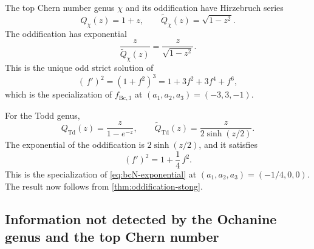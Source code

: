 \documentclass[14pt,dvipsnames]{extarticle}
\makeatletter
\numberwithin{equation}{subsection}
\theoremstyle{plain}
\theoremstyle{definition}
\theoremstyle{definition}
\renewenvironment{proof}[1][\proofname]{
 \par\pushQED{\qed}\normalfont
 \topsep6\p@\@plus6\p@\relax
 \trivlist\item[\hskip\labelsep\bfseries\itshape #1\@addpunct{.}]
}{\popQED\endtrivlist\@endpefalse}
\DeclareMathOperator{\Td}{Td}
\newcommand{\Bc}{\mathrm{Bc}}
\makeatother
\begin{document}
\begin{proof}[Proof of \cref{cor:bc-euler-todd-stong}]
The top Chern number genus $\chi$ and its oddification have Hirzebruch series
\[
 Q_\chi(z)=1+z,
 \qquad
 \widetilde Q_\chi(z)=\sqrt{1-z^2}.
\]
The oddification has exponential
\[
 \frac{z}{\widetilde Q_\chi(z)}
 =\frac{z}{\sqrt{1-z^2}}.
\]
This is the unique odd strict solution of
\[
 (\,f')^2=(1+f^2)^3
 =1+3f^2+3f^4+f^6,
\]
which is the specialization of $f_{\Bc,3}$ at
$(a_1,a_2,a_3)=(-3,3,-1)$.

For the Todd genus,
\[
 Q_{\Td}(z)=\frac{z}{1-e^{-z}},
 \qquad
 \widetilde Q_{\Td}(z)=\frac{z}{2\sinh(z/2)}.
\]
The exponential of the oddification is $2\sinh(z/2)$, and it satisfies
\[
 (f')^2=1+\frac14\,f^2.
\]
This is the specialization of \eqref{eq:bcN-exponential} at
$(a_1,a_2,a_3)=(-1/4,0,0)$. The result now follows from
\cref{thm:oddification-stong}.
\end{proof}

\subsection{Information not detected by the Ochanine genus and the top Chern number}
\label{sec:bc-not-determined}
\end{document}
